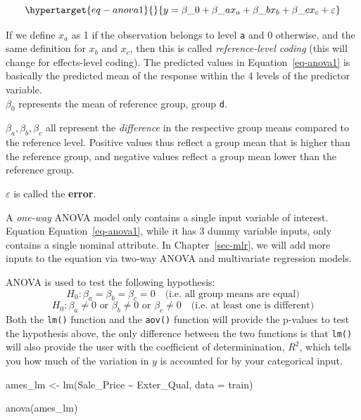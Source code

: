 \documentclass[
  letterpaper,
  DIV=11,
  numbers=noendperiod]{scrreprt}
\newenvironment{Shaded}{\begin{snugshade}}{\end{snugshade}}
\newcommand{\AttributeTok}[1]{\textcolor[rgb]{0.40,0.45,0.13}{#1}}
\newcommand{\FunctionTok}[1]{\textcolor[rgb]{0.28,0.35,0.67}{#1}}
\newcommand{\NormalTok}[1]{\textcolor[rgb]{0.00,0.23,0.31}{#1}}
\newcommand{\OtherTok}[1]{\textcolor[rgb]{0.00,0.23,0.31}{#1}}
\newcommand{\SpecialCharTok}[1]{\textcolor[rgb]{0.37,0.37,0.37}{#1}}
\begin{document}
\begin{equation}\protect\hypertarget{eq-anova1}{}{
y=\beta\_0 + \beta\_ax_a+\beta\_bx_b+\beta\_cx_c + \varepsilon  
}\label{eq-anova1}\end{equation}

If we define \(x_a\) as 1 if the observation belongs to level \texttt{a}
and 0 otherwise, and the same definition for \(x_b\) and \(x_c\), then
this is called \emph{reference-level coding} (this will change for
effects-level coding). The predicted values in Equation~\ref{eq-anova1}
is basically the predicted mean of the response within the 4 levels of
the predictor variable.\\

\(\beta_0\) represents the mean of reference group, group \texttt{d}.

\(\beta_a, \beta_b, \beta_c\) all represent the \emph{difference} in the
respective group means compared to the reference level. Positive values
thus reflect a group mean that is higher than the reference group, and
negative values reflect a group mean lower than the reference group.

\(\varepsilon\) is called the \textbf{error}.

A \emph{one-way} ANOVA model only contains a single input variable of
interest. Equation Equation~\ref{eq-anova1}, while it has 3 dummy
variable inputs, only contains a single nominal attribute. In
Chapter~\ref{sec-mlr}, we will add more inputs to the equation via
two-way ANOVA and multivariate regression models.

ANOVA is used to test the following hypothesis:
\[H_0: \beta_a=\beta_b=\beta_c = 0 \quad\text{(i.e. all group means are equal)}\]
\[H_0: \beta_a\neq0\mbox{ or }\beta_b\neq0 \mbox{ or } \beta_c \neq 0 \quad\text{(i.e. at least one is different)}\]
Both the \texttt{lm()} function and the \texttt{aov()} function will
provide the p-values to test the hypothesis above, the only difference
between the two functions is that \texttt{lm()} will also provide the
user with the coefficient of determinination, \(R^2\), which tells you
how much of the variation in \(y\) is accounted for by your categorical
input.

\begin{Shaded}
\begin{Highlighting}[]
\NormalTok{ames\_lm }\OtherTok{\textless{}{-}} \FunctionTok{lm}\NormalTok{(Sale\_Price }\SpecialCharTok{\textasciitilde{}}\NormalTok{ Exter\_Qual, }\AttributeTok{data =}\NormalTok{ train)}

\FunctionTok{anova}\NormalTok{(ames\_lm)}
\end{Highlighting}
\end{Shaded}
\end{document}
